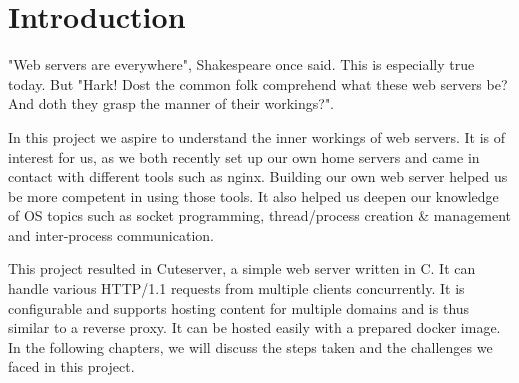 \section*{Introduction}
"Web servers are everywhere", Shakespeare once said. This is especially true today. But "Hark! Dost the common folk comprehend what these web servers be? And doth they grasp the manner of their workings?". %

In this project we aspire to understand the inner workings of web servers. It is of interest for us, as we both recently set up our own home servers and came in contact with different tools such as nginx. Building our own web server helped us be more competent in using those tools. It also helped us deepen our knowledge of OS topics such as socket programming, thread/process creation \& management and inter-process communication.  

This project resulted in Cuteserver, a simple web server written in C. It can handle various HTTP/1.1 requests from multiple clients concurrently. It is configurable and supports hosting content for multiple domains and is thus similar to a reverse proxy. It can be hosted easily with a prepared docker image. In the following chapters, we will discuss the steps taken and the challenges we faced in this project.

